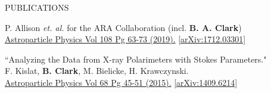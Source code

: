 \documentclass{resume} %
\begin{document}
\begin{rSection}{PUBLICATIONS}
\begin{etaremune}
 P. Allison {\it et. al.} for the ARA Collaboration (incl. \textbf{B. A. Clark}) \\
  \href{https://doi.org/10.1016/j.astropartphys.2019.01.004}{Astroparticle Physics Vol 108 Pg 63-73 (2019).} \href{https://arxiv.org/abs/1712.03301}{[arXiv:1712.03301]} 
   \item ``Analyzing the Data from X-ray Polarimeters with Stokes Parameters." \\
 F. Kislat,  \textbf{B. Clark}, M. Bielicke, H. Krawczynski.  \\
  \href{http://dx.doi.org/10.1016/j.astropartphys.2015.02.007}{Astroparticle Physics Vol 68 Pg 45-51 (2015).} \href{https://arxiv.org/abs/1409.6214}{[arXiv:1409.6214]} 
 \end{etaremune}
\end{rSection}

\end{document}
